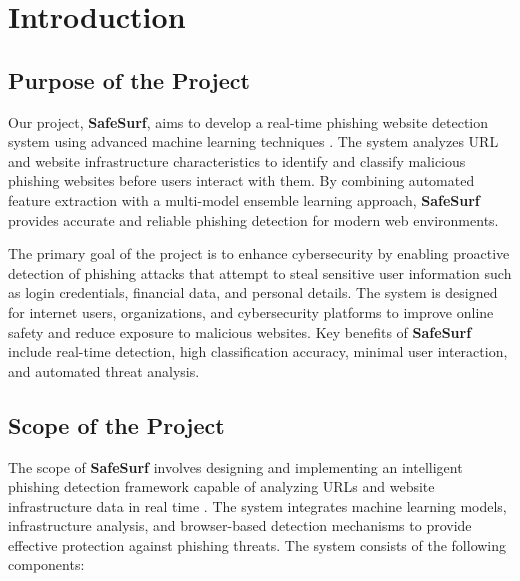 \chapter{Introduction}

\section{Purpose of the Project}

Our project, \textbf{SafeSurf}, aims to develop a real-time phishing website detection system using advanced machine learning techniques \cite{ref1}. The system analyzes URL and website infrastructure characteristics to identify and classify malicious phishing websites before users interact with them. By combining automated feature extraction with a multi-model ensemble learning approach, \textbf{SafeSurf} provides accurate and reliable phishing detection for modern web environments.

The primary goal of the project is to enhance cybersecurity by enabling proactive detection of phishing attacks that attempt to steal sensitive user information such as login credentials, financial data, and personal details. The system is designed for internet users, organizations, and cybersecurity platforms to improve online safety and reduce exposure to malicious websites. Key benefits of \textbf{SafeSurf} include real-time detection, high classification accuracy, minimal user interaction, and automated threat analysis.

\section{Scope of the Project}

The scope of \textbf{SafeSurf} involves designing and implementing an intelligent phishing detection framework capable of analyzing URLs and website infrastructure data in real time \cite{ref15, ref16, ref17}. The system integrates machine learning models, infrastructure analysis, and browser-based detection mechanisms to provide effective protection against phishing threats.
The system consists of the following components:

